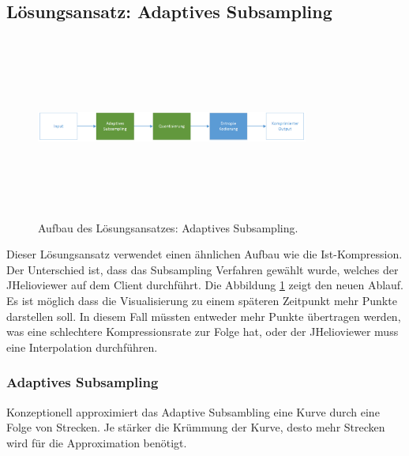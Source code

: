 \subsection{Lösungsansatz: Adaptives Subsampling} \label{konzept:loesung0}
\begin{figure}[!htbp]
	\center
	\includegraphics[width=0.8\textwidth,height=6cm,keepaspectratio]{./pictures/konzept/solution0/aufbau.png}
	\caption{Aufbau des Lösungsansatzes: Adaptives Subsampling.}
	\label{konzept:loesung0:aufbau:diagramm}
\end{figure} 
Dieser Lösungsansatz verwendet einen ähnlichen Aufbau wie die Ist-Kompression. Der Unterschied ist, dass das Subsampling Verfahren gewählt wurde, welches der JHelioviewer auf dem Client durchführt. Die Abbildung \ref{konzept:loesung0:aufbau:diagramm} zeigt den neuen Ablauf.\\
Es ist möglich dass die Visualisierung zu einem späteren Zeitpunkt mehr Punkte darstellen soll. In diesem Fall müssten entweder mehr Punkte übertragen werden, was eine schlechtere Kompressionsrate zur Folge hat, oder der JHelioviewer muss eine Interpolation durchführen. 

\subsubsection{Adaptives Subsampling}\label{konzept:loesung0:subsampling}
Konzeptionell approximiert das Adaptive Subsambling eine Kurve durch eine Folge von Strecken. Je stärker die Krümmung der Kurve, desto mehr Strecken wird für die Approximation benötigt.

